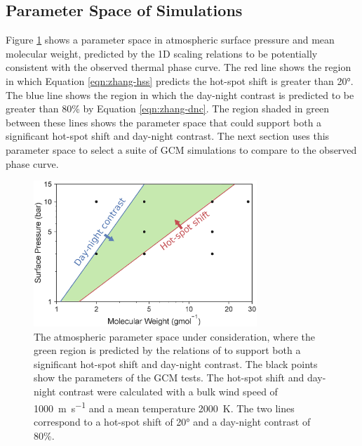 \subsection{Parameter Space of Simulations}\label{sec:param-space}

Figure \ref{fig:param_map} shows a parameter space in atmospheric surface pressure and mean molecular weight, predicted by the 1D scaling relations to be potentially consistent with the observed thermal phase curve. The red line shows the region in which Equation \ref{eqn:zhang-hss} predicts the hot-spot shift is greater than \ang{20}. The blue line shows the region in which the day-night contrast is predicted to be greater than 80\% by Equation \ref{eqn:zhang-dnc}. The region shaded in green between these lines shows the parameter space that could support both a significant hot-spot shift and day-night contrast. The next section uses this parameter space to select a suite of GCM simulations to compare to the observed phase curve.

\begin{figure}
  \centering
  \includegraphics[width=0.75\textwidth]{figures/linking-climate-55cnce/param_map_edited.eps}
\caption{The atmospheric parameter space under consideration, where the green region is predicted by the relations of \citet{zhang2017dynamics} to support both a significant hot-spot shift and day-night contrast. The black points show the parameters of the GCM tests. The hot-spot shift and day-night contrast were calculated with a bulk wind speed of \SI{1000}{\metre\per\second} and a mean temperature \SI{2000}{\kelvin}. The two lines correspond to a hot-spot shift of \ang{20} and a day-night contrast of 80\%.}\label{fig:param_map}
\end{figure}




